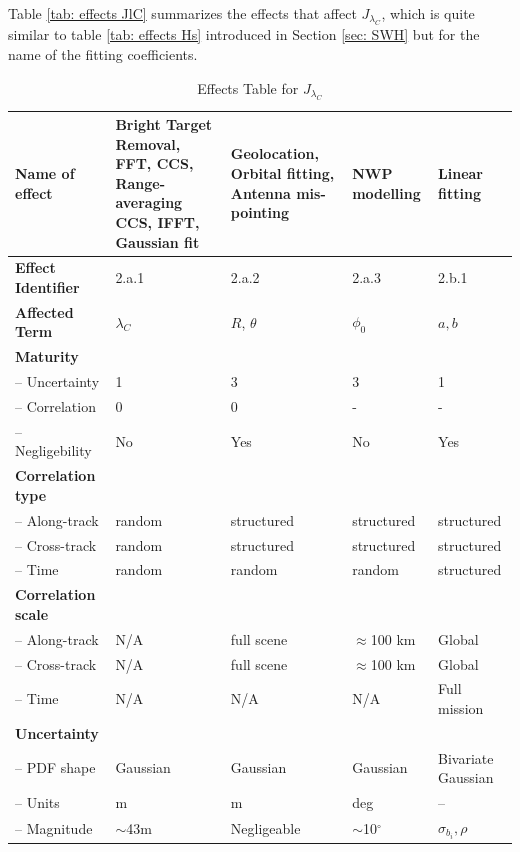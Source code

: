 Table \ref{tab: effects JlC} summarizes the effects that affect $J_{\lambda_{C}}$, which is quite similar to table \ref{tab: effects Hs} introduced in Section \ref{sec: SWH} but for the name of the fitting coefficients.
\begin{table}[h]
		\centering
		\scriptsize %
		\setlength{\tabcolsep}{2pt} %
		\caption{Effects Table for $J_{\lambda_{C}}$}
		
		\begin{tabularx}{\textwidth}{l | X | X | X | X}
			\toprule
			\textbf{Name of effect} & Bright Target Removal, FFT, CCS, Range-averaging CCS, IFFT, Gaussian fit & Geolocation, Orbital fitting, Antenna mis-pointing & NWP modelling & Linear fitting \\
			\midrule
			\textbf{Effect Identifier} & 2.a.1 & 2.a.2 & 2.a.3 & 2.b.1 \\
			\midrule
			\textbf{Affected Term} & $\lambda_C$ & $R$, $\theta$ & $\phi_{0}$ & $a, b$ \\
			\midrule
			\textbf{Maturity} &  &  &  &  \\
			\quad -- Uncertainty & 1 & 3 & 3 & 1 \\
			\quad -- Correlation & 0 & 0 & - & - \\
			\quad -- Negligebility & No & Yes & No & Yes \\
			\midrule
			\textbf{Correlation type} &  &  &  &  \\
			\quad -- Along-track & random & structured & structured & structured \\
			\quad -- Cross-track & random & structured & structured & structured \\
			\quad -- Time & random & random & random & structured \\
			\midrule
			\textbf{Correlation scale} &  &  &  &  \\
			\quad -- Along-track & N/A & full scene & $\approx$100 km & Global \\
			\quad -- Cross-track & N/A & full scene & $\approx$100 km & Global \\
			\quad -- Time & N/A & N/A & N/A & Full mission \\
			\midrule
			\textbf{Uncertainty} & & & & \\
			\quad -- PDF shape & Gaussian & Gaussian & Gaussian & Bivariate Gaussian \\
			\quad -- Units & m & m & deg & -- \\
			\quad -- Magnitude & $\sim$43m & Negligeable & $\sim$10$^\circ$ & $\sigma_{b_i}, \rho$ \\

\end{tabularx}
\end{table}
